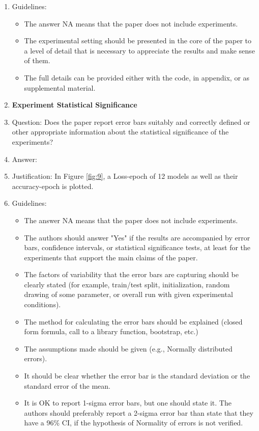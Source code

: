 \documentclass{article}
\begin{document}
\begin{enumerate}
    \item[] Guidelines:
    \begin{itemize}
        \item The answer NA means that the paper does not include experiments.
        \item The experimental setting should be presented in the core of the paper to a level of detail that is necessary to appreciate the results and make sense of them.
        \item The full details can be provided either with the code, in appendix, or as supplemental material.
    \end{itemize}

\item {\bf Experiment Statistical Significance}
    \item[] Question: Does the paper report error bars suitably and correctly defined or other appropriate information about the statistical significance of the experiments?
    \item[] Answer: \answerYes{} %
    \item[] Justification: In Figure \ref{fig:9}, a Loss-epoch of 12 models as well as their accuracy-epoch is plotted. 
    \item[] Guidelines:
    \begin{itemize}
        \item The answer NA means that the paper does not include experiments.
        \item The authors should answer "Yes" if the results are accompanied by error bars, confidence intervals, or statistical significance tests, at least for the experiments that support the main claims of the paper.
        \item The factors of variability that the error bars are capturing should be clearly stated (for example, train/test split, initialization, random drawing of some parameter, or overall run with given experimental conditions).
        \item The method for calculating the error bars should be explained (closed form formula, call to a library function, bootstrap, etc.)
        \item The assumptions made should be given (e.g., Normally distributed errors).
        \item It should be clear whether the error bar is the standard deviation or the standard error of the mean.
        \item It is OK to report 1-sigma error bars, but one should state it. The authors should preferably report a 2-sigma error bar than state that they have a 96\% CI, if the hypothesis of Normality of errors is not verified.

\end{itemize}
\end{enumerate}
\end{document}
